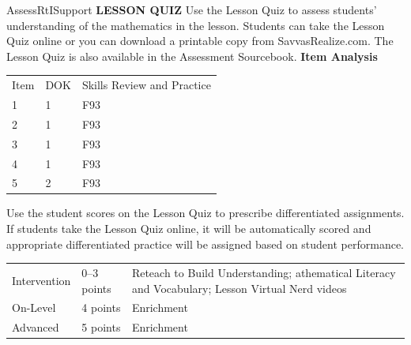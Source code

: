 \documentclass{article}
\newenvironment{te-addendum}[2]{}{}     %
\newcommand{\te}[1]{}                   %
\begin{document}
\begin{te-addendum}{Assess}{RtISupport}
\textbf{LESSON QUIZ}
Use the Lesson Quiz to assess students' understanding of the mathematics in the lesson.
Students can take the Lesson Quiz online or you can download a printable copy from SavvasRealize.com. The Lesson Quiz is also available in the Assessment Sourcebook.
\textbf{Item Analysis}
\begin{tabular}{lll}
Item & DOK & Skills Review and Practice \\
1 & 1 & F93 \\
2 & 1 & F93 \\
3 & 1 & F93 \\
4 & 1 & F93 \\
5 & 2 & F93 \\
\end{tabular}
Use the student scores on the Lesson Quiz to prescribe differentiated assignments.
If students take the Lesson Quiz online, it will be automatically scored and appropriate differentiated practice will be assigned based on student performance.
\begin{tabular}{lll}
Intervention & 0--3 points & Reteach to Build Understanding; athematical Literacy and Vocabulary; Lesson Virtual Nerd videos \\
On-Level & 4 points & Enrichment \\
Advanced & 5 points & Enrichment \\
\end{tabular}
\te{Printed ``athematical'' omits initialM; likely Mathematical. Assessment. Lesson Quiz is available at SavvasRealize.com.}
\end{te-addendum}
\end{document}
